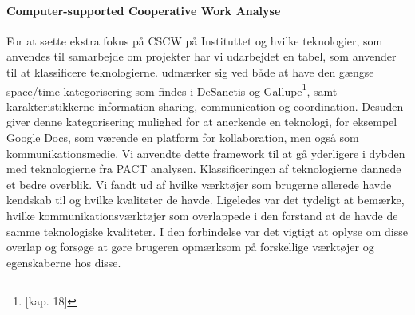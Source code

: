 \paragraph{Computer-supported Cooperative Work Analyse}
For at sætte ekstra fokus på CSCW på Instituttet og hvilke teknologier, som anvendes til samarbejde om projekter har vi udarbejdet en tabel, som anvender \citep{Penichet} til at klassificere teknologierne. \citep{Penichet} udmærker sig ved både at have den gængse space/time-kategorisering som findes i DeSanctis og Gallupe\footnote{\citep{Benyon}[kap. 18]}, samt karakteristikkerne information sharing, communication og coordination. Desuden giver denne kategorisering mulighed for at anerkende en teknologi, for eksempel Google Docs, som værende en platform for kollaboration, men også som kommunikationsmedie. 
Vi anvendte dette framework til at gå yderligere i dybden med teknologierne fra PACT analysen. Klassificeringen af teknologierne dannede et bedre overblik. Vi fandt ud af hvilke værktøjer som brugerne allerede havde kendskab til og hvilke kvaliteter de havde. Ligeledes var det tydeligt at bemærke, hvilke kommunikationsværktøjer som overlappede i den forstand at de havde de samme teknologiske kvaliteter. I den forbindelse var det vigtigt at oplyse om disse overlap og forsøge at gøre brugeren opmærksom på forskellige værktøjer og egenskaberne hos disse. 

